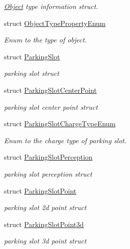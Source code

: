 \begin{DoxyCompactItemize}
\begin{DoxyCompactList}\small\item\em \hyperlink{structmaf__perception__interface_1_1Object}{Object} type information struct. \end{DoxyCompactList}\item 
struct \hyperlink{structmaf__perception__interface_1_1ObjectTypePropertyEnum}{Object\+Type\+Property\+Enum}
\begin{DoxyCompactList}\small\item\em Enum to the type of object. \end{DoxyCompactList}\item 
struct \hyperlink{structmaf__perception__interface_1_1ParkingSlot}{Parking\+Slot}
\begin{DoxyCompactList}\small\item\em parking slot struct \end{DoxyCompactList}\item 
struct \hyperlink{structmaf__perception__interface_1_1ParkingSlotCenterPoint}{Parking\+Slot\+Center\+Point}
\begin{DoxyCompactList}\small\item\em parking slot center point struct \end{DoxyCompactList}\item 
struct \hyperlink{structmaf__perception__interface_1_1ParkingSlotChargeTypeEnum}{Parking\+Slot\+Charge\+Type\+Enum}
\begin{DoxyCompactList}\small\item\em Enum to the charge type of parking slot. \end{DoxyCompactList}\item 
struct \hyperlink{structmaf__perception__interface_1_1ParkingSlotPerception}{Parking\+Slot\+Perception}
\begin{DoxyCompactList}\small\item\em parking slot perception struct \end{DoxyCompactList}\item 
struct \hyperlink{structmaf__perception__interface_1_1ParkingSlotPoint}{Parking\+Slot\+Point}
\begin{DoxyCompactList}\small\item\em parking slot 2d point struct \end{DoxyCompactList}\item 
struct \hyperlink{structmaf__perception__interface_1_1ParkingSlotPoint3d}{Parking\+Slot\+Point3d}
\begin{DoxyCompactList}\small\item\em parking slot 3d point struct \end{DoxyCompactList}\item 

\end{DoxyCompactItemize}
